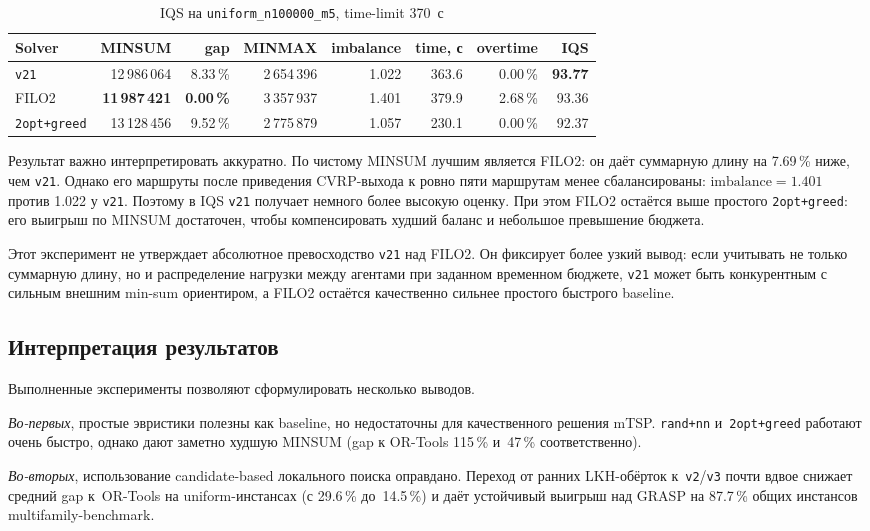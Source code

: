 \documentclass[14pt,a4paper]{extarticle}
\begin{document}
\begin{table}[H]
\centering
\caption{IQS на \texttt{uniform\_n100000\_m5}, time-limit 370~с}
\scriptsize
\begin{tabular}{lrrrrrrr}
\toprule
Solver & MINSUM & gap & MINMAX & imbalance & time, с & overtime & IQS\\
\midrule
\texttt{v21} & 12\,986\,064 & 8.33\,\% & 2\,654\,396 & 1.022 & 363.6 & 0.00\,\% & \textbf{93.77}\\
FILO2 & \textbf{11\,987\,421} & \textbf{0.00\,\%} & 3\,357\,937 & 1.401 & 379.9 & 2.68\,\% & 93.36\\
\texttt{2opt+greed} & 13\,128\,456 & 9.52\,\% & 2\,775\,879 & 1.057 & 230.1 & 0.00\,\% & 92.37\\
\bottomrule
\end{tabular}
\normalsize
\end{table}

Результат важно интерпретировать аккуратно. По чистому MINSUM лучшим является FILO2: он даёт суммарную длину на 7.69\,\% ниже, чем \texttt{v21}. Однако его маршруты после приведения CVRP-выхода к ровно пяти маршрутам менее сбалансированы: $\mathrm{imbalance}=1.401$ против 1.022 у \texttt{v21}. Поэтому в IQS \texttt{v21} получает немного более высокую оценку. При этом FILO2 остаётся выше простого \texttt{2opt+greed}: его выигрыш по MINSUM достаточен, чтобы компенсировать худший баланс и небольшое превышение бюджета.

Этот эксперимент не утверждает абсолютное превосходство \texttt{v21} над FILO2. Он фиксирует более узкий вывод: если учитывать не только суммарную длину, но и распределение нагрузки между агентами при заданном временном бюджете, \texttt{v21} может быть конкурентным с сильным внешним min-sum ориентиром, а FILO2 остаётся качественно сильнее простого быстрого baseline.
\subsection{Интерпретация результатов}

Выполненные эксперименты позволяют сформулировать несколько выводов.

\textit{Во-первых}, простые эвристики полезны как baseline, но недостаточны для качественного решения mTSP. \texttt{rand+nn} и~\texttt{2opt+greed} работают очень быстро, однако дают заметно худшую MINSUM (gap к OR-Tools 115\,\% и~47\,\% соответственно).

\textit{Во-вторых}, использование candidate-based локального поиска оправдано. Переход от ранних LKH-обёрток к~\texttt{v2}/\texttt{v3} почти вдвое снижает средний gap к~OR-Tools на uniform-инстансах (с 29.6\,\% до~14.5\,\%) и даёт устойчивый выигрыш над GRASP на 87.7\,\% общих инстансов multifamily-benchmark.
\end{document}

